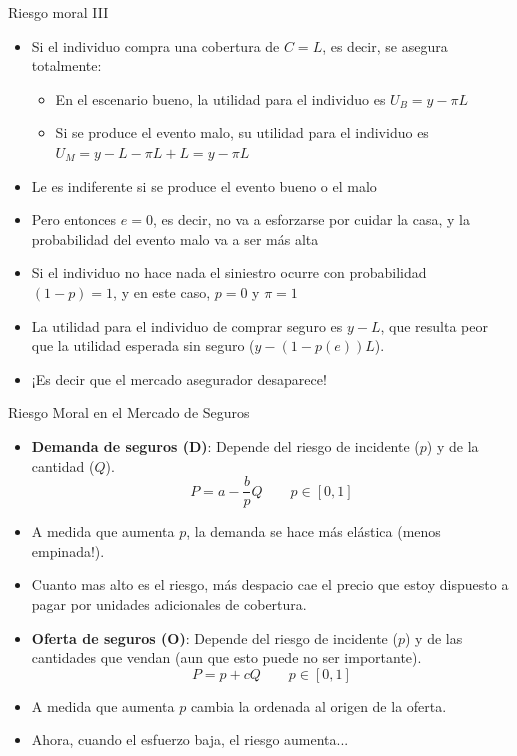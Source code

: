 \documentclass{beamer}
\begin{document}
\begin{frame}{Riesgo moral III}
    \begin{itemize}
    \item Si el individuo compra una cobertura de $C=L$, es decir, se asegura totalmente:
    \begin{itemize}
    \item En el escenario bueno, la utilidad para el individuo es 
    $U_B = y - \pi L$
    \item Si se produce el evento malo, su utilidad para el individuo es 
    $U_M = y - L - \pi L + L = y - \pi L$ 
    \end{itemize}
    \item Le es indiferente si se produce el evento bueno o el malo 
    \item Pero entonces $e=0$, es decir, no va a esforzarse por cuidar la casa, y la probabilidad del evento malo va a ser más alta \vspace{2mm}
    \item Si el individuo no hace nada el siniestro ocurre con probabilidad $(1-p)=1$, y en este caso, $p=0$ y $\pi=1$
    \item La utilidad para el individuo de comprar seguro es $y-L$, que resulta peor que la utilidad esperada sin seguro ($y - (1-p(e))L$).
    \item ¡Es decir que el mercado asegurador desaparece! 
  \end{itemize}   

\hyperlink{volver2}{}
\end{frame}

\begin{frame}{Riesgo Moral en el Mercado de Seguros} \label{moralhazard}
    \begin{itemize}
            \item \textbf{Demanda de seguros (D)}: Depende del riesgo de incidente ($p$) y de la cantidad ($Q$).
            \[P = a - \frac{b}{p} Q \qquad p\in[0,1]\]
            \item A medida que aumenta $p$, la demanda se hace más elástica (menos empinada!).
            \item Cuanto mas alto es el riesgo, más despacio cae el precio que estoy dispuesto a pagar por unidades adicionales de cobertura.
            \item \textbf{Oferta de seguros (O)}: Depende del riesgo de incidente ($p$) y de las cantidades que vendan (aun que esto puede no ser importante).
            \[P = p + c Q \qquad p\in[0,1]\]
            \item A medida que aumenta $p$ cambia la ordenada al origen de la oferta.
            \item Ahora, cuando el esfuerzo baja, el riesgo aumenta...
    \end{itemize}
\end{frame}
    
\end{document}
